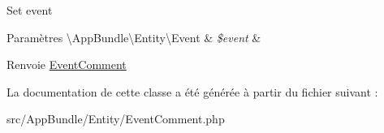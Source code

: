 Set event


\begin{DoxyParams}[1]{Paramètres}
\textbackslash{}\+App\+Bundle\textbackslash{}\+Entity\textbackslash{}\+Event & {\em \$event} & \\
\hline
\end{DoxyParams}
\begin{DoxyReturn}{Renvoie}
\hyperlink{classAppBundle_1_1Entity_1_1EventComment}{Event\+Comment} 
\end{DoxyReturn}


La documentation de cette classe a été générée à partir du fichier suivant \+:\begin{DoxyCompactItemize}
\item 
src/\+App\+Bundle/\+Entity/Event\+Comment.\+php\end{DoxyCompactItemize}
